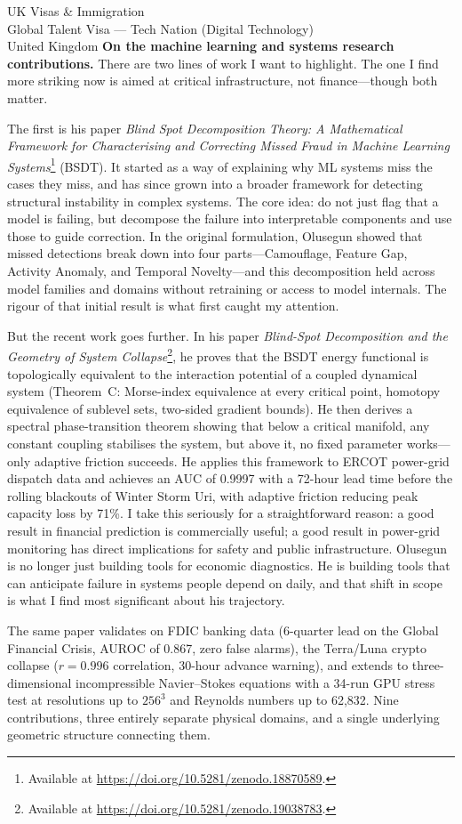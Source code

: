 \documentclass[12pt,a4paper]{letter}
\begin{document}
\begin{letter}{UK Visas \& Immigration\\
Global Talent Visa --- Tech Nation (Digital Technology)\\
United Kingdom}
\textbf{On the machine learning and systems research contributions.} There are two lines of work I want to highlight. The one I find more striking now is aimed at critical infrastructure, not finance---though both matter.

The first is his paper \textit{Blind Spot Decomposition Theory: A Mathematical Framework for Characterising and Correcting Missed Fraud in Machine Learning Systems}\footnote{Available at \url{https://doi.org/10.5281/zenodo.18870589}.} (BSDT). It started as a way of explaining why ML systems miss the cases they miss, and has since grown into a broader framework for detecting structural instability in complex systems. The core idea: do not just flag that a model is failing, but decompose the failure into interpretable components and use those to guide correction. In the original formulation, Olusegun showed that missed detections break down into four parts---Camouflage, Feature Gap, Activity Anomaly, and Temporal Novelty---and this decomposition held across model families and domains without retraining or access to model internals. The rigour of that initial result is what first caught my attention.

But the recent work goes further. In his paper \textit{Blind-Spot Decomposition and the Geometry of System Collapse}\footnote{Available at \url{https://doi.org/10.5281/zenodo.19038783}.}, he proves that the BSDT energy functional is topologically equivalent to the interaction potential of a coupled dynamical system (Theorem~C: Morse-index equivalence at every critical point, homotopy equivalence of sublevel sets, two-sided gradient bounds). He then derives a spectral phase-transition theorem showing that below a critical manifold, any constant coupling stabilises the system, but above it, no fixed parameter works---only adaptive friction succeeds. He applies this framework to ERCOT power-grid dispatch data and achieves an AUC of 0.9997 with a 72-hour lead time before the rolling blackouts of Winter Storm Uri, with adaptive friction reducing peak capacity loss by 71\%. I take this seriously for a straightforward reason: a good result in financial prediction is commercially useful; a good result in power-grid monitoring has direct implications for safety and public infrastructure. Olusegun is no longer just building tools for economic diagnostics. He is building tools that can anticipate failure in systems people depend on daily, and that shift in scope is what I find most significant about his trajectory.

The same paper validates on FDIC banking data (6-quarter lead on the Global Financial Crisis, AUROC of 0.867, zero false alarms), the Terra/Luna crypto collapse ($r = 0.996$ correlation, 30-hour advance warning), and extends to three-dimensional incompressible Navier--Stokes equations with a 34-run GPU stress test at resolutions up to $256^3$ and Reynolds numbers up to 62,832. Nine contributions, three entirely separate physical domains, and a single underlying geometric structure connecting them.


\end{letter}
\end{document}
